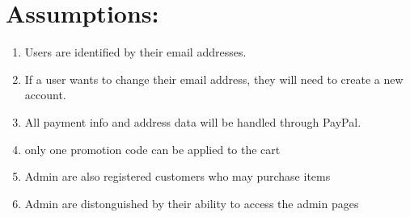 \documentclass[10pt,letter]{article}
\begin{document}
\section{Assumptions:}
\begin{enumerate}
    \item Users are identified by their email addresses.
    \item If a user wants to change their email address, they will need to create a new account.
    \item All payment info and address data will be handled through PayPal.
    \item only one promotion code can be applied to the cart
    \item Admin are also registered customers who may purchase items
    \item Admin are distonguished by their ability to access the admin pages
\end{enumerate}
\end{document}
